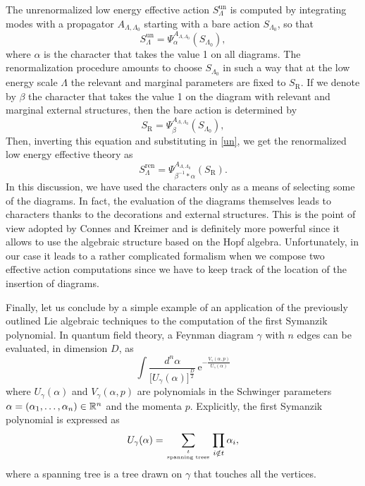 \documentclass[10pt,here,feynmf]{article}
\begin{document}
The unrenormalized low energy effective action $S_{\Lambda}^{\mathrm{un}}$ is computed by integrating modes with a propagator $A_{\Lambda,\Lambda_{0}}$ starting with a bare action $S_{\Lambda_{0}}$, so that
\begin{equation} 
S_{\Lambda}^{\mathrm{un}}=\Psi_{\alpha}^{A_{\Lambda,\Lambda_{0}}}(S_{\Lambda_{0}}),\label{un}
\end{equation}  
where $\alpha$ is the character that takes the value 1 on all diagrams. The renormalization procedure amounts to choose $S_{\Lambda_{0}}$ in such a way that at the low energy scale $\Lambda$ the relevant and marginal parameters are fixed to $S_{\mathrm{R}}$. If we denote by $\beta$ the character that takes the value 1 on the diagram with relevant and marginal external structures, then the bare action is determined by
\begin{equation} 
S_{\mathrm{R}}=\Psi_{\beta}^{A_{\Lambda,\Lambda_{0}}}(S_{\Lambda_{0}}),
\end{equation}  
Then, inverting this equation and substituting in \eqref{un}, we get the renormalized low energy effective theory as
\begin{equation} 
S_{\Lambda}^{\mathrm{ren}}=\Psi_{\beta^{-1}\ast\alpha}^{A_{\Lambda,\Lambda_{0}}}(S_{\mathrm{R}}).
\end{equation}  
In this discussion, we have used the characters only as a means of selecting some of the diagrams. In fact, the evaluation of the diagrams themselves leads to characters thanks to the decorations and external structures. This is the point of view adopted by Connes and Kreimer and is definitely more powerful since it allows to use the algebraic structure based on the Hopf algebra. Unfortunately, in our case it leads to a rather complicated formalism when we compose two effective action computations since we have to keep track of the location of the insertion of diagrams. 

Finally, let us conclude by a simple example of an application of the previously outlined Lie algebraic techniques to the computation of the first Symanzik polynomial. In quantum field theory, a Feynman diagram $\gamma$ with $n$ edges can be evaluated, in dimension $D$, as
\begin{equation}
\int \frac{d^{n}\alpha}{\big[\textstyle{U_{\gamma}(\alpha)}\big]^{\frac{D}{2}}}\,\mathrm{e}^{-\frac{V_{\gamma}(\alpha,p)}{U_{\gamma}(\alpha)}}
\end{equation}
where $U_{\gamma}(\alpha)$ and $V_{\gamma}(\alpha,p)$ are polynomials in the Schwinger parameters $\alpha=(\alpha_{1},\dots,\alpha_{n})\in{\Bbb R}^{n}$ and the momenta $p$. Explicitly, the first Symanzik polynomial is expressed as 
\begin{equation}
U_{\gamma}(\alpha)=\sum_{t\atop \mbox{\tiny spanning trees}}\prod_{i\notin t}\alpha_{i},
\end{equation}
where a spanning tree is a tree drawn on $\gamma$ that touches all the vertices.
\end{document}

